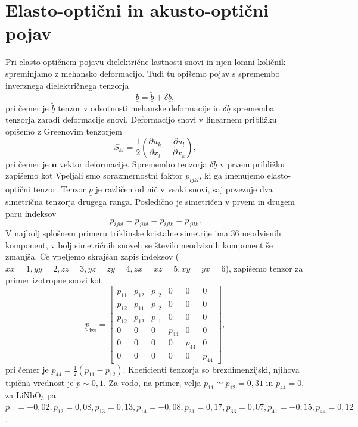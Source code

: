 \section{Elasto-optični in akusto-optični pojav}
Pri elasto-optičnem pojavu dielektrične lastnosti snovi in njen lomni količnik
spreminjamo z mehansko deformacijo. Tudi tu opišemo pojav
s spremembo inverznega dielektričnega tenzorja
\begin{equation}
\underline{b} = \underline{\tilde{b}}+ \delta\underline{b},
\end{equation}
pri čemer je $\underline{\tilde{b}}$ tenzor v odsotnosti mehanske deformacije in
$\delta\underline{b}$ sprememba tenzorja zaradi deformacije snovi. Deformacijo
snovi v linearnem približku opišemo z Greenovim tenzorjem 
\begin{equation}
S_{kl}=\frac{1}{2}\left({\frac{\partial u_{k}}{\partial x_{l}}}+
{\frac{\partial u_{l}}{\partial x_{k}}}\right),
\label{7.28}
\end{equation}
pri čemer je $\mathbf{u}$ vektor deformacije. Spremembo tenzorja
$\delta\underline{b}$ v prvem približku zapišemo kot 
Vpeljali smo sorazmernostni faktor
$p_{ijkl}$, ki ga imenujemo elasto-optični tenzor. 
Tenzor $\underline{p}$ je različen od nič v vsaki snovi, saj povezuje dva simetrična tenzorja 
drugega ranga. Posledično je simetričen v prvem in drugem paru indeksov
\begin{equation}
p_{ijkl} = p_{jikl} = p_{ijlk} =p_{jilk}.
\end{equation}
V najbolj splošnem primeru triklinske kristalne simetrije 
ima 36 neodvisnih komponent, v bolj simetričnih snoveh se število 
neodvisnih komponent še zmanjša. Če vpeljemo skrajšan zapis indeksov ($xx = 1,
yy=2, zz = 3, yz = zy = 4, zx = xz = 5, xy = yx = 6$), zapišemo tenzor za primer izotropne snovi kot
\begin{equation}
\underline{p}_{\textrm{izo}} = 
\left[\begin{array}{cccccc}
p_{11} & p_{12}& p_{12}&0&0&0\\
p_{12} & p_{11}& p_{12}&0&0&0\\
p_{12} & p_{12}& p_{11}&0&0&0\\
0 & 0& 0&p_{44}&0&0\\
0 & 0& 0&0&p_{44}&0\\
0 & 0& 0&0&0&p_{44}
\end{array}\right],
\label{tenzorp}
\end{equation}
pri čemer je $p_{44}= \frac{1}{2}(p_{11}-p_{12})$. Koeficienti tenzorja so 
brezdimenzijski, njihova tipična vrednost je $p\sim0,1$. Za vodo, na primer, 
velja $p_{11} \simeq p_{12} = 0,31$ in $p_{44} = 0$, za LiNbO$_3$ pa $p_{11} = -0,02, 
p_{12} = 0,08, p_{13} = 0,13,  p_{14} = -0,08, p_{31} = 0,17, p_{33} = 0,07,
p_{41} = -0,15, p_{44} = 0,12$.

